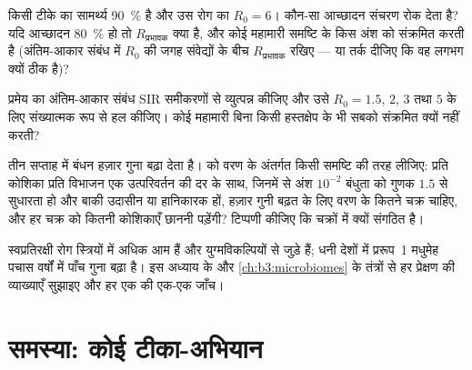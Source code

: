 \begin{exercise}[$\star\star$]\label{exo:b3:adaptive-immunity:9}
किसी टीके का सामर्थ्य \qty{90}{\%} है और उस रोग का $R_{0} = 6$। कौन-सा
आच्छादन संचरण रोक देता है? यदि आच्छादन \qty{80}{\%} हो तो
$R_{\text{प्रभावक}}$ क्या है, और कोई महामारी समष्टि के किस अंश को संक्रमित
करती है (अंतिम-आकार संबंध में $R_{0}$ की जगह संवेद्यों के बीच
$R_{\text{प्रभावक}}$ रखिए --- या तर्क दीजिए कि वह लगभग क्यों ठीक है)?
\end{exercise}

\begin{exercise}[$\star\star\star$]\label{exo:b3:adaptive-immunity:10}
प्रमेय का अंतिम-आकार संबंध SIR समीकरणों से व्युत्पन्न कीजिए और उसे
$R_{0} = 1.5$, $2$, $3$ तथा $5$ के लिए संख्यात्मक रूप से हल कीजिए। कोई
महामारी बिना किसी हस्तक्षेप के भी सबको संक्रमित क्यों नहीं करती?
\end{exercise}

\begin{exercise}[$\star\star\star$]\label{exo:b3:adaptive-immunity:11}
 तीन सप्ताह में बंधन हज़ार गुना बढ़ा देता है। 
को वरण के अंतर्गत किसी समष्टि की तरह लीजिए: प्रति कोशिका प्रति विभाजन
एक उत्परिवर्तन की दर के साथ, जिनमें से अंश $10^{-2}$ बंधुता को गुणक
$1.5$ से सुधारता हो और बाकी उदासीन या हानिकारक हों, हज़ार गुनी बढ़त के
लिए वरण के कितने चक्र चाहिए, और हर चक्र को कितनी कोशिकाएँ छाननी
पड़ेंगी? टिप्पणी कीजिए कि  चक्रों में क्यों संगठित है।
\end{exercise}

\begin{exercise}[$\star\star\star$]\label{exo:b3:adaptive-immunity:12}
स्वप्रतिरक्षी रोग स्त्रियों में अधिक आम हैं और  युग्मविकल्पियों से
जुड़े हैं; धनी देशों में प्ररूप~1 मधुमेह पचास वर्षों में पाँच गुना बढ़ा
है। इस अध्याय के और \cref{ch:b3:microbiomes} के तंत्रों से हर प्रेक्षण
की व्याख्याएँ सुझाइए और हर एक की एक-एक जाँच।
\end{exercise}

\section{समस्या: कोई टीका-अभियान}

